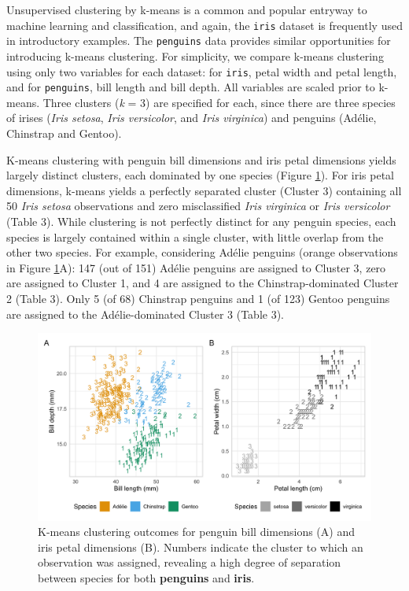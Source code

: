 Unsupervised clustering by k-means is a common and popular entryway to
machine learning and classification, and again, the \texttt{iris}
dataset is frequently used in introductory examples. The
\texttt{penguins} data provides similar opportunities for introducing
k-means clustering. For simplicity, we compare k-means clustering using
only two variables for each dataset: for \texttt{iris}, petal width and
petal length, and for \texttt{penguins}, bill length and bill depth. All
variables are scaled prior to k-means. Three clusters (\emph{k} = 3) are
specified for each, since there are three species of irises (\emph{Iris
setosa}, \emph{Iris versicolor}, and \emph{Iris virginica}) and penguins
(Adélie, Chinstrap and Gentoo).

K-means clustering with penguin bill dimensions and iris petal
dimensions yields largely distinct clusters, each dominated by one
species (Figure \ref{fig:kmeans}). For iris petal dimensions, k-means
yields a perfectly separated cluster (Cluster 3) containing all 50
\emph{Iris setosa} observations and zero misclassified \emph{Iris
virginica} or \emph{Iris versicolor} (Table 3). While clustering is not
perfectly distinct for any penguin species, each species is largely
contained within a single cluster, with little overlap from the other
two species. For example, considering Adélie penguins (orange
observations in Figure \ref{fig:kmeans}A): 147 (out of 151) Adélie
penguins are assigned to Cluster 3, zero are assigned to Cluster 1, and
4 are assigned to the Chinstrap-dominated Cluster 2 (Table 3). Only 5
(of 68) Chinstrap penguins and 1 (of 123) Gentoo penguins are assigned
to the Adélie-dominated Cluster 3 (Table 3).

\begin{Schunk}
\begin{figure}[htbp]

{\centering \includegraphics[width=\textwidth]{figs/kmeans-1} 

}

\caption[K-means clustering outcomes for penguin bill dimensions (A) and iris petal dimensions (B)]{K-means clustering outcomes for penguin bill dimensions (A) and iris petal dimensions (B). Numbers indicate the cluster to which an observation was assigned, revealing a high degree of separation between species for both \textbf{penguins} and \textbf{iris}.}\label{fig:kmeans}
\end{figure}
\end{Schunk}

